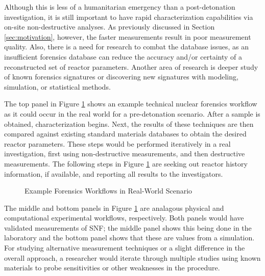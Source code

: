 Although this is less of a humanitarian emergency than a post-detonation
investigation, it is still important to have rapid characterization
capabilities via on-site non-destructive analyses.  As previously discussed in
Section \ref{sec:motivation}, however, the faster measurements result in poor
measurement quality. Also, there is a need for research to combat the database
issues, as an insufficient forensics database can reduce the accuracy and/or
certainty of a reconstructed set of reactor parameters.  Another area of
research is deeper study of known forensics signatures or discovering new
signatures with modeling, simulation, or statistical methods. 

The top panel in Figure \ref{fig:nfworkflow} shows an example technical nuclear
forensics workflow as it could occur in the real world for a pre-detonation
scenario.  After a sample is obtained, characterization begins.  Next, the
results of these techniques are then compared against existing standard
materials databases to obtain the desired reactor parameters. These steps would
be performed iteratively in a real investigation, first using non-destructive
measurements, and then destructive measurements.  The following steps in Figure
\ref{fig:nfworkflow} are seeking out reactor history information, if available,
and reporting all results to the investigators. 
\\
\begin{figure}[!h]
  \caption{Example Forensics Workflows in Real-World Scenario}
  \label{fig:nfworkflow}
\end{figure}

The middle and bottom panels in Figure \ref{fig:nfworkflow} are analagous
physical and computational experimental workflows, respectively.  Both panels
would have validated measurements of \gls{SNF}; the middle panel shows this
being done in the laboratory and the bottom panel shows that these are values
from a simulation.  For studying alternative measurement techniques or a slight
difference in the overall approach, a researcher would iterate through multiple
studies using known materials to probe sensitivities or other weaknesses in the
procedure.

